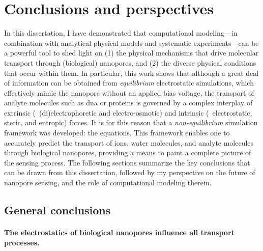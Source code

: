 \chapter{Conclusions and perspectives}
%
\label{ch:conclusion}
%

%
%


In this dissertation, I have demonstrated that computational modeling---in combination with analytical
physical models and systematic experiments---can be a powerful tool to shed light on (1) the physical
mechanisms that drive molecular transport through (biological) nanopores, and (2) the diverse physical
conditions that occur within them. In particular, this work shows that although a great deal of information
can be obtained from \emph{equilibrium} electrostatic simulations, which effectively mimic the nanopore
without an applied bias voltage, the transport of analyte molecules such as \gls{dna} or proteins is governed
by a complex interplay of extrinsic (\ie~(di)electrophoretic and electro-osmotic) and intrinsic
(\ie~electrostatic, steric, and entropic) forces. It is for this reason that a \emph{non-equilibrium}
simulation framework was developed: the  equations. This framework enables one to accurately
predict the transport of ions, water molecules, and analyte molecules through biological nanopores, providing
a means to paint a complete picture of the sensing process. The following sections summarize the key
conclusions that can be drawn from this dissertation, followed by my perspective on the future of nanopore
sensing, and the role of computational modeling therein.


%
\section{General conclusions}
%
\label{sec:con:conclusions}
%



\subsubsection{The electrostatics of biological nanopores influence all transport processes.}
%

